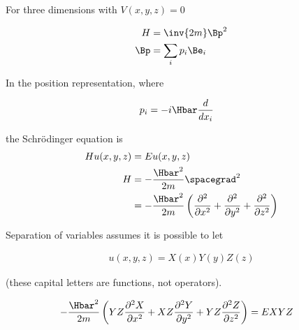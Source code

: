 %
%
For three dimensions with \(V(x,y,z) = 0\)

\begin{equation}\label{eqn:lecture5BigReviewCh4FreeParticle:20}
\begin{aligned}
H &= \inv{2m} \Bp^2 \\
\Bp &= \sum_i p_i \Be_i \\
\end{aligned}
\end{equation}

In the position representation, where

\begin{equation}\label{eqn:lecture5BigReviewCh4FreeParticle:40}
\begin{aligned}
p_i &= -i \Hbar \frac{d}{dx_i}
\end{aligned}
\end{equation}

the Schr\"{o}dinger equation is
\begin{equation}\label{eqn:lecture5BigReviewCh4FreeParticle:60}
\begin{aligned}
H u(x,y,z) &= E u(x,y,z) \\
H &= -\frac{\Hbar^2}{2m} \spacegrad^2 \\
&= -\frac{\Hbar^2}{2m} \left(
\frac{\partial^2}{\partial {x}^2}
+\frac{\partial^2}{\partial {y}^2}
+\frac{\partial^2}{\partial {z}^2}
\right)
\end{aligned}
\end{equation}

Separation of variables assumes it is possible to let

\begin{equation}\label{eqn:lecture5BigReviewCh4FreeParticle:80}
\begin{aligned}
u(x,y,z) = X(x) Y(y) Z(z)
\end{aligned}
\end{equation}

(these capital letters are functions, not operators).

\begin{equation}\label{eqn:lecture5BigReviewCh4FreeParticle:100}
\begin{aligned}
-\frac{\Hbar^2}{2m} \left(
YZ \frac{\partial^2 X}{\partial {x}^2}
+ XZ \frac{\partial^2 Y}{\partial {y}^2}
+ YZ \frac{\partial^2 Z}{\partial {z}^2}\right)
&= E X Y Z
\end{aligned}
\end{equation}

